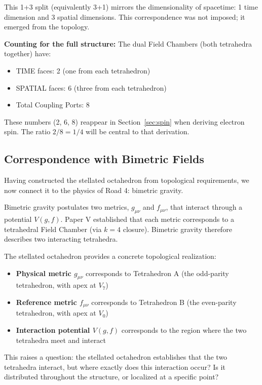\documentclass[aps,prd,preprint,superscriptaddress,showpacs,preprintnumbers,amsmath,amssymb,nofootinbib]{revtex4-2}
\begin{document}
This 1+3 split (equivalently 3+1) mirrors the dimensionality of spacetime: 1 time dimension and 3 spatial dimensions. This correspondence was not imposed; it emerged from the topology.

\textbf{Counting for the full structure:} The dual Field Chambers (both tetrahedra together) have:
\begin{itemize}
\item TIME faces: 2 (one from each tetrahedron)
\item SPATIAL faces: 6 (three from each tetrahedron)
\item Total Coupling Ports: 8
\end{itemize}

These numbers (2, 6, 8) reappear in Section~\ref{sec:spin} when deriving electron spin. The ratio $2/8 = 1/4$ will be central to that derivation.

\subsection{Correspondence with Bimetric Fields}
\label{subsec:correspondence}

Having constructed the stellated octahedron from topological requirements, we now connect it to the physics of Road 4: bimetric gravity.

Bimetric gravity postulates two metrics, $g_{\mu\nu}$ and $f_{\mu\nu}$, that interact through a potential $V(g,f)$. Paper V established that each metric corresponds to a tetrahedral Field Chamber (via $k=4$ closure). Bimetric gravity therefore describes two interacting tetrahedra.

The stellated octahedron provides a concrete topological realization:
\begin{itemize}
\item \textbf{Physical metric $g_{\mu\nu}$} corresponds to Tetrahedron A (the odd-parity tetrahedron, with apex at $V_7$)
\item \textbf{Reference metric $f_{\mu\nu}$} corresponds to Tetrahedron B (the even-parity tetrahedron, with apex at $V_0$)
\item \textbf{Interaction potential $V(g,f)$} corresponds to the region where the two tetrahedra meet and interact
\end{itemize}

This raises a question: the stellated octahedron establishes that the two tetrahedra interact, but where exactly does this interaction occur? Is it distributed throughout the structure, or localized at a specific point?
\end{document}
